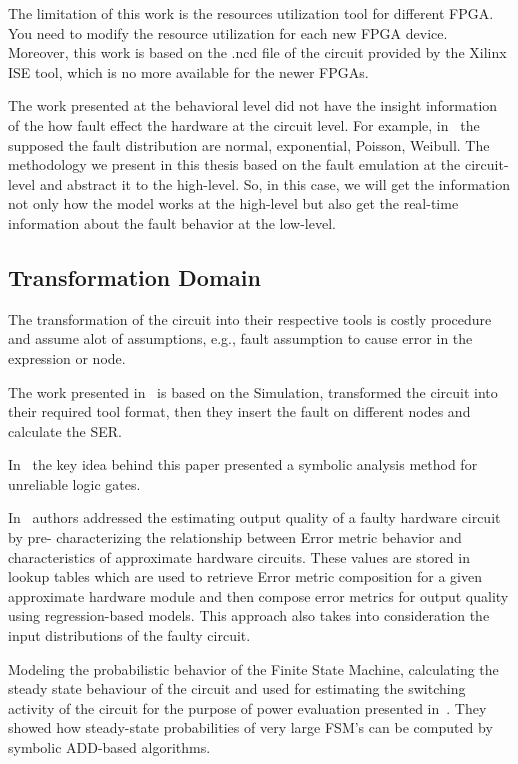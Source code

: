 The limitation of this work is the resources utilization tool for different FPGA. You need to modify the resource utilization for each new FPGA device. Moreover, this work is based on the .ncd file of the circuit provided by the Xilinx ISE tool, which is no more available for the newer FPGAs. 

The work presented at the behavioral level did not have the insight information of the how fault effect the hardware at the circuit level. For example, in~\cite{janschek2017errorsim} the supposed the fault distribution are normal, exponential, Poisson, Weibull. The methodology we present in this thesis based on the fault emulation at the circuit-level and abstract it to the high-level. So, in this case, we will get the information not only how the model works at the high-level but also get the real-time information about the fault behavior at the low-level.


\subsection{Transformation Domain}


The transformation of the circuit into their respective tools is costly procedure and assume alot of assumptions, e.g., fault assumption to cause error in the expression or node.



The work presented in~\cite{ubar2014modeling} is based on the Simulation, transformed the circuit into their required tool format, then they
insert the fault on different nodes and calculate the SER. 

In~\cite{brkic2014symbolic} the key idea behind this paper presented a symbolic analysis method for unreliable logic
gates. 

In~\cite{chan2013statistical} authors addressed the estimating output quality of a faulty hardware circuit by pre-
characterizing the relationship between Error metric behavior and characteristics of approximate
hardware circuits. These values are stored in lookup tables which are used to retrieve Error metric
composition for a given approximate hardware module and then compose error metrics for output
quality using regression-based models. This approach also takes into consideration the input
distributions of the faulty circuit. 


Modeling the probabilistic behavior of the Finite State Machine, calculating the steady state
behaviour of the circuit and used for estimating the switching activity of the circuit for the purpose of
power evaluation presented in~\cite{hachtel1996markovian}. They showed how steady-state probabilities of very large FSM’s can be computed by
symbolic ADD-based algorithms.


